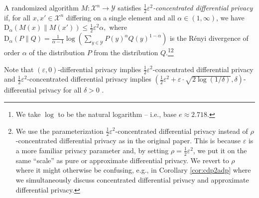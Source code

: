 \documentclass{jpcfinal} %
\newcommand{\dr}[3]{\mathrm{D}_{#1}\left(#2\middle\|#3\right)}
\newcommand{\eps}{\varepsilon}
\begin{document}
\begin{defi}\label{defn:cdp}
A randomized algorithm $M\colon \mathcal{X}^n \to \mathcal{Y}$ satisfies \emph{$\frac12 \eps^2$-concentrated differential privacy} if, for all $x,x' \in \mathcal{X}^n$ differing on a single element and all $\alpha \in (1,\infty)$, we have $\dr{\alpha}{M(x)}{M(x')} \le \frac12 \eps^2  \alpha,$ where $\dr{\alpha}{P}{Q} = \frac{1}{\alpha-1} \log\left(\sum_{y \in \mathcal{Y}} P(y)^\alpha Q(y)^{1-\alpha}\right)$ is the R\'enyi divergence of order $\alpha$ of the distribution $P$ from the distribution $Q$.\footnote{We take $\log$ to be the natural logarithm -- i.e., base $e \approx 2.718$.}\footnote{We use the parameterization $\frac12\eps^2$-concentrated differential privacy instead of $\rho$-concentrated differential privacy as in the original paper. This is because $\eps$ is a more familiar privacy parameter and, by setting $\rho = \frac12\eps^2$, we put it on the same ``scale'' as pure or approximate differential privacy. We revert to $\rho$ where it might otherwise be confusing, e.g., in Corollary \ref{cor:cdp2adp} where we simultaneously discuss concentrated differential privacy and approximate differential privacy.}
\end{defi}

Note that $(\eps,0)$-differential privacy implies $\frac12 \eps^2$-concentrated differential privacy and $\frac12 \eps^2$-concentrated differential privacy implies $\left(\frac12 \eps^2 + \eps \cdot \sqrt{2\log(1/\delta)},\delta\right)$-differential privacy for all $\delta>0$ \citep{BunS16}.
\end{document}
